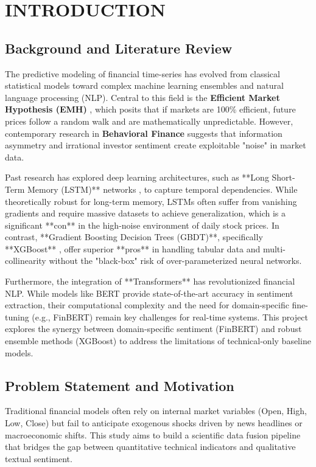 \chapter{INTRODUCTION}

\section{Background and Literature Review}
The predictive modeling of financial time-series has evolved from classical statistical models toward complex machine learning ensembles and natural language processing (NLP). Central to this field is the \textbf{Efficient Market Hypothesis (EMH)} \citep{fama1970}, which posits that if markets are 100\% efficient, future prices follow a random walk and are mathematically unpredictable. However, contemporary research in \textbf{Behavioral Finance} \citep{shiller2003} suggests that information asymmetry and irrational investor sentiment create exploitable "noise" in market data.

Past research has explored deep learning architectures, such as **Long Short-Term Memory (LSTM)** networks \citep{hochreiter1997}, to capture temporal dependencies. While theoretically robust for long-term memory, LSTMs often suffer from vanishing gradients and require massive datasets to achieve generalization, which is a significant **con** in the high-noise environment of daily stock prices. In contrast, **Gradient Boosting Decision Trees (GBDT)**, specifically **XGBoost** \citep{chen2016}, offer superior **pros** in handling tabular data and multi-collinearity without the "black-box" risk of over-parameterized neural networks. 

Furthermore, the integration of **Transformers** \citep{vaswani2017} has revolutionized financial NLP. While models like BERT provide state-of-the-art accuracy in sentiment extraction, their computational complexity and the need for domain-specific fine-tuning (e.g., FinBERT) remain key challenges for real-time systems. This project explores the synergy between domain-specific sentiment (FinBERT) and robust ensemble methods (XGBoost) to address the limitations of technical-only baseline models.

\section{Problem Statement and Motivation}
Traditional financial models often rely on internal market variables (Open, High, Low, Close) but fail to anticipate exogenous shocks driven by news headlines or macroeconomic shifts. This study aims to build a scientific data fusion pipeline that bridges the gap between quantitative technical indicators and qualitative textual sentiment. 

